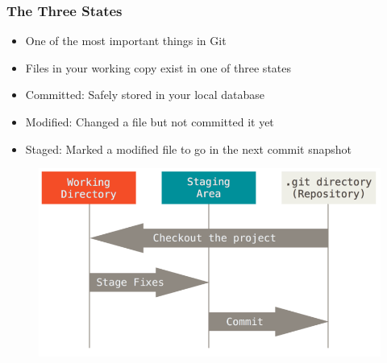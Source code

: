 \documentclass{beamer}
\begin{document}

\begin{frame}
	\frametitle{The Three States}
	\begin{itemize}
		\item{One of the most important things in Git}
		\item{Files in your working copy exist in one of three states}
		\item{Committed: Safely stored in your local database}
		\item{Modified: Changed a file but not committed it yet}
		\item{Staged: Marked a modified file to go in the next commit snapshot}
	\end{itemize}
	\begin{figure}
		\includegraphics[scale=0.25]{The_Three_States-0.png}
	\end{figure}

\end{frame}
\end{document}
